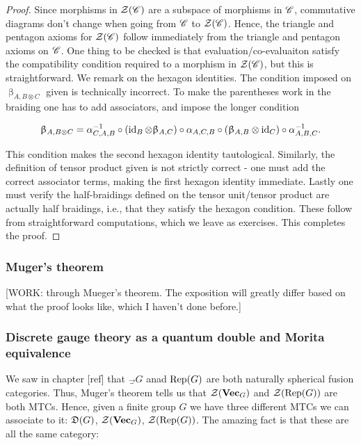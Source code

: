 \begin{proof} Since morphisms in $\mathcal{Z}(\mathscr{C})$ are a subspace of morphisms in $\mathscr{C}$, commutative diagrams don't change when going from $\mathscr{C}$ to $\mathcal{Z}(\mathscr{C})$. Hence, the triangle and pentagon axioms for $\mathcal{Z}(\mathscr{C})$ follow immediately from the triangle and pentagon axioms on $\mathscr{C}$. One thing to be checked is that evaluation/co-evaluaiton satisfy the compatibility condition required to a morphism in $\mathcal{Z}(\mathscr{C})$, but this is straightforward. We remark on the hexagon identities. The condition imposed on $\upbeta_{A,B\otimes C}$ given is technically incorrect. To make the parentheses work in the braiding one has to add associators, and impose the longer condition

$$\upbeta_{A,B\otimes C}=\alpha_{C,A,B}^{-1}\circ \left(\operatorname{id}_{B}\otimes \upbeta_{A,C}\right)\circ \alpha_{A,C,B}\circ\left(\upbeta_{A,B}\otimes \operatorname{id}_C\right)\circ \alpha^{-1}_{A,B,C}.$$

This condition makes the second hexagon identity tautological. Similarly, the definition of tensor product given is not strictly correct - one must add the correct associator terms, making the first hexagon identity immediate. Lastly one must verify the half-braidings defined on the tensor unit/tensor product are actually half braidings, i.e., that they satisfy the hexagon condition. These follow from straightforward computations, which we leave as exercises. This completes the proof.

\end{proof}

\subsubsection{Muger's theorem}

[WORK: through Mueger's theorem. The exposition will greatly differ based on what the proof looks like, which I haven't done before.]

\subsubsection{Discrete gauge theory as a quantum double and Morita equivalence}

We saw in chapter [ref] that $\Vec_G$ anad $\operatorname{Rep}(G)$ are both naturally spherical fusion categories. Thus, Muger's theorem tells us that $\mathcal{Z}(\mathbf{Vec}_G)$ and $\mathcal{Z}(\operatorname{Rep}(G))$ are both MTCs. Hence, given a finite group $G$ we have three different MTCs we can associate to it: $\mathfrak{D}(G)$, $\mathcal{Z}(\mathbf{Vec}_G)$, $\mathcal{Z}(\operatorname{Rep}(G))$. The amazing fact is that these are all the same category:

